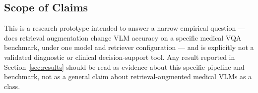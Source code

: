 \subsection{Scope of Claims}

This is a research prototype intended to answer a narrow empirical
question --- does retrieval augmentation change VLM accuracy on a specific
medical VQA benchmark, under one model and retriever configuration --- and
is explicitly not a validated diagnostic or clinical decision-support tool.
Any result reported in Section~\ref{sec:results} should be read as evidence
about this specific pipeline and benchmark, not as a general claim about
retrieval-augmented medical VLMs as a class.
